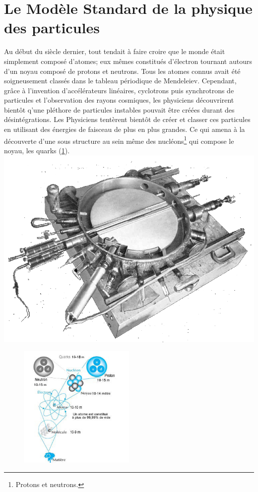 \section{Le Modèle Standard de la physique des particules}
 
Au début du siècle dernier, tout tendait à faire croire que le monde était simplement composé d'atomes; eux mêmes constitués d'électron tournant autours d'un noyau composé de protons et neutrons. Tous les atomes connus avait été soigneusement classés dans le tableau périodique de Mendeleiev. Cependant, grâce à l'invention d'accélérateurs linéaires, cyclotrons puis synchrotrons de particules et l'observation des rayons cosmiques, les physiciens découvrirent bientôt q'une pléthore de particules instables pouvait être créées durant des désintégrations. Les Physiciens tentèrent bientôt de créer et classer ces particules en utilisant des énergies de faisceau de plus en plus grandes. Ce qui amena à la découverte d'une sous structure au sein même des nucléons\footnote{Protons et neutrons.} qui compose le noyau, les quarks (\ref{structure}).
\marginpar
{
	\includegraphics[width=\marginparwidth]{SM/cyclotron.png}
    	\label{atom}
}
\begin{figure}[h!]
\centering
\includegraphics[width=0.50\textwidth]{SM/structure.jpg}
\label{structure}
\end{figure}

